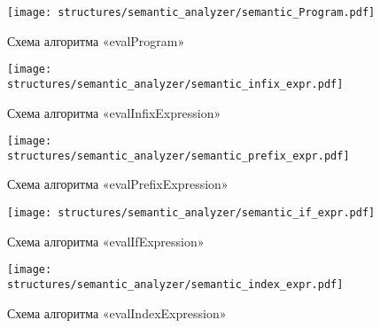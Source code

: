 
\clearpage

\begin{figure}[!htp]
	\centering
	\texttt{[image: structures/semantic\_analyzer/semantic\_Program.pdf]}
	\caption{Схема алгоритма «evalProgram»}
	\label{f:evalProgram}
\end{figure}

\clearpage

\begin{figure}[!htp]
	\centering
	\texttt{[image: structures/semantic\_analyzer/semantic\_infix\_expr.pdf]}
	\caption{Схема алгоритма «evalInfixExpression»}
	\label{f:semantic_infix_expr}
\end{figure}

\clearpage

\begin{figure}[!htp]
	\centering
	\texttt{[image: structures/semantic\_analyzer/semantic\_prefix\_expr.pdf]}
	\caption{Схема алгоритма «evalPrefixExpression»}
	\label{f:semantic_prefix_expr}
\end{figure}

\clearpage

\begin{figure}[!htp]
	\centering
	\texttt{[image: structures/semantic\_analyzer/semantic\_if\_expr.pdf]}
	\caption{Схема алгоритма «evalIfExpression»}
	\label{f:semantic_if_expr}
\end{figure}

\clearpage

\begin{figure}[!htp]
	\centering
	\texttt{[image: structures/semantic\_analyzer/semantic\_index\_expr.pdf]}
	\caption{Схема алгоритма «evalIndexExpression»}
	\label{f:semantic_index_expr}
\end{figure}